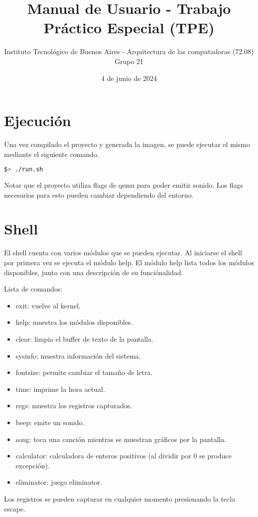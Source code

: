 \documentclass{article}
\title{\textbf{Manual de Usuario - Trabajo Práctico Especial (TPE)}}
\author{ \large Instituto Tecnológico de Buenos Aires - Arquitectura de las computadoras (72.08) \\ [1ex]
\large Grupo 21}
\date{4 de junio de 2024}
\begin{document}
\maketitle

\section *{Ejecución}

Una vez compilado el proyecto y generada la imagen, se puede ejecutar el mismo mediante el siguiente comando.

\begin{lstlisting}[language=bash]
$> ./run.sh
\end{lstlisting}

Notar que el proyecto utiliza flags de qemu para poder emitir sonido. Los flags necesarios para esto pueden cambiar dependiendo del entorno.

\section *{Shell}

El shell cuenta con varios módulos que se pueden ejecutar. Al iniciarse el shell por primera vez se ejecuta el módulo help. El módulo help lista todos los módulos disponibles, junto con una descripción de su funciónalidad.

Lista de comandos:
\begin{itemize}
\item exit: vuelve al kernel.
\item help: muestra los módulos disponibles.
\item clear: limpia el buffer de texto de la pantalla.
\item sysinfo: muestra información del sistema.
\item fontsize: permite cambiar el tamaño de letra.
\item time: imprime la hora actual.
\item regs: muestra los registros capturados.
\item beep: emite un sonido.
\item song: toca una canción mientras se muestran gráficos por la pantalla.
\item calculator: calculadora de enteros positivos (al dividir por 0 se produce excepción).
\item eliminator: juego eliminator.
\end{itemize}
Los registros se pueden capturar en cualquier momento presionando la tecla escape.
\end{document}
